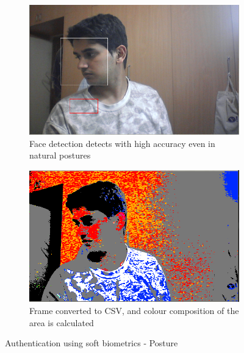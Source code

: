 \documentclass[12pt]{article}			%
\begin{document}
\begin{figure}[h!]
        \begin{subfigure}[b]{0.5\textwidth}
                \centering
                \includegraphics[scale=0.35]{img/soft6.png}
                \caption{Face detection detects with high accuracy even in natural postures}
                \label{fig:soft3_org}
        \end{subfigure}%
        \begin{subfigure}[b]{0.5\textwidth}
                \centering
                \includegraphics[scale=0.35]{img/soft6_csv.png}
                \caption{Frame converted to CSV, and colour composition of the area is calculated}
                \label{fig:soft3_csv}
        \end{subfigure}
        \caption{Authentication using soft biometrics - Posture}\label{fig:soft3}
\end{figure}
\end{document}
